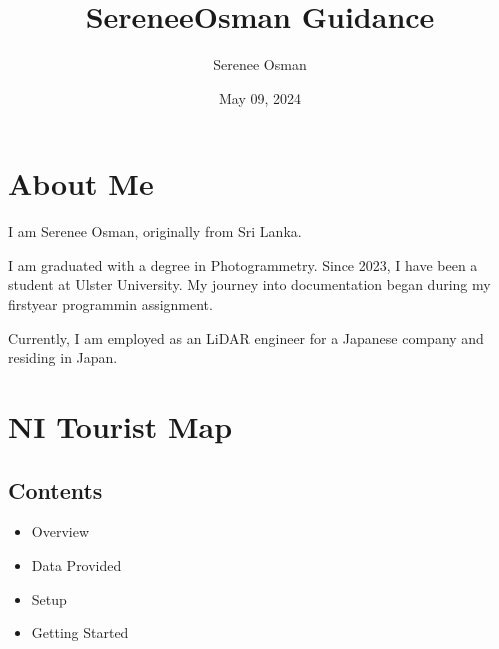 \documentclass[letterpaper,10pt,english]{sphinxmanual}
\title{SereneeOsman Guidance}
\date{May 09, 2024}
\author{Serenee Osman}
\begin{document}
\pagestyle{empty}
\sphinxmaketitle
\pagestyle{plain}
\sphinxtableofcontents
\pagestyle{normal}
\label{\detokenize{index::doc}}


\sphinxstepscope


\chapter{About Me}
\label{\detokenize{Other/About_Me:about-me}}\label{\detokenize{Other/About_Me::doc}}
\sphinxAtStartPar
I am Serenee Osman, originally from Sri Lanka.

\sphinxAtStartPar
I am graduated with a degree in Photogrammetry.
Since 2023, I have been a student at Ulster University. My journey into documentation began during my first\sphinxhyphen{}year programmin assignment.

\sphinxAtStartPar
Currently, I am employed as an LiDAR engineer for a Japanese company and residing in Japan.

\sphinxstepscope


\chapter{NI Tourist Map}
\label{\detokenize{egm722_serenee/NI_Tourist_Map_doc:ni-tourist-map}}\label{\detokenize{egm722_serenee/NI_Tourist_Map_doc::doc}}
\sphinxAtStartPar
{}

\sphinxAtStartPar
{}



\sphinxAtStartPar
{}


\section{Contents}
\label{\detokenize{egm722_serenee/NI_Tourist_Map_doc:contents}}\begin{itemize}
\item {} 
\sphinxAtStartPar
Overview

\item {} 
\sphinxAtStartPar
Data Provided

\item {} 
\sphinxAtStartPar
Setup

\item {} 
\sphinxAtStartPar
Getting Started

\end{itemize}
\end{document}

